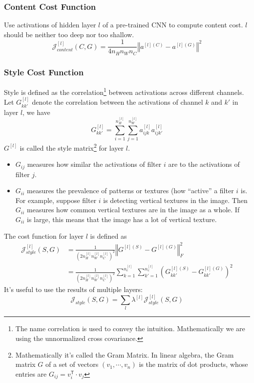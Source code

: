 \subsubsection{Content Cost Function}
Use activations of hidden layer $l$ of a pre-trained CNN to compute content cost. $l$ should be neither too deep nor too shallow.
  \[\mathcal{J}_{content}^{[l]}(C,G)=\frac{1}{4n_Hn_Wn_C}\left\Vert a^{[l](C)}-a^{[l](G)}\right\Vert^2\]
\subsubsection{Style Cost Function}
Style is defined as the correlation\footnote{The name correlation is used to convey the intuition. Mathematically we are using the unnormalized cross covariance.} between activations across different channels. Let $G^{[l]}_{kk'}$ denote the correlation between the activations of channel $k$ and $k'$ in layer $l$, we have
\[G^{[l]}_{kk'}=\displaystyle\sum_{i=1}^{n_H^{[l]}}\displaystyle\sum_{j=1}^{n_W^{[l]}}a^{[l]}_{ijk}a^{[l]}_{ijk'}\]
$G^{[l]}$ is called the style matrix\footnote{Mathematically it's called the Gram Matrix. In linear algebra, the Gram matrix $G$ of a set of vectors $(v_1,\cdots,v_n)$ is the matrix of dot products, whose entries are $G_{ij}=v_i^{\mathsf{T}}\cdot v_j$} for layer $l$.
\begin{itemize}
  \item $G_{ij}$ measures how similar the activations of filter $i$  are to the activations of filter $j$.
  \item $G_{ii}$ measures the prevalence of patterns or textures (how ``active'' a filter $i$ is. For example, suppose filter  $i$  is detecting vertical textures in the image. Then $G_{ii}$ measures how common vertical textures are in the image as a whole. If $G_{ii}$ is large, this means that the image has a lot of vertical texture.
\end{itemize}
The cost function for layer $l$ is defined as 
\begin{align*}
  \mathcal{J}_{style}^{[l]}(S,G)&=\frac{1}{\left(2n_H^{[l]}n_W^{[l]}n_C^{[l]}\right)^2}\left\Vert G^{[l](S)}-G^{[l](G)}\right\Vert^2_F\\
  &=\frac{1}{\left(2n_H^{[l]}n_W^{[l]}n_C^{[l]}\right)^2}\displaystyle\sum_{k=1}^{n_c^{[l]}}\displaystyle\sum_{k'=1}^{n_c^{[l]}}\left(G^{[l](S)}_{kk'}-G^{[l](G)}_{kk'}\right)^2
\end{align*}
It's useful to use the results of multiple layers:
\[\mathcal{J}_{style}(S,G)=\displaystyle\sum_{l}\lambda^{[l]}\mathcal{J}_{style}^{[l]}(S,G)\]
\ifx\PREAMBLE\undefined

\fi